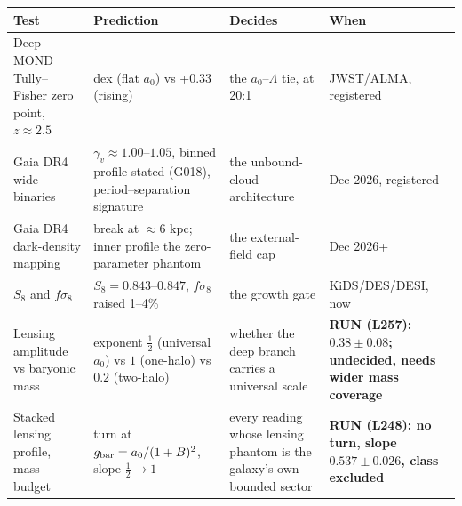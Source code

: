 \documentclass[
  11pt,
]{article}
\newcounter{none} %
\begin{document}
{\def\LTcaptype{none} %
\begin{longtable}[]{@{}
  >{\raggedright\arraybackslash}p{}
  >{\raggedright\arraybackslash}p{}
  >{\raggedright\arraybackslash}p{}
  >{\raggedright\arraybackslash}p{}@{}}
\toprule\noalign{}
\begin{minipage}[b]{\linewidth}\raggedright
Test
\end{minipage} & \begin{minipage}[b]{\linewidth}\raggedright
Prediction
\end{minipage} & \begin{minipage}[b]{\linewidth}\raggedright
Decides
\end{minipage} & \begin{minipage}[b]{\linewidth}\raggedright
When
\end{minipage} \\
\midrule\noalign{}
\endhead
\bottomrule\noalign{}
\endlastfoot
Deep-MOND Tully--Fisher zero point, \(z \approx 2.5\) & 0.00 dex (flat
\(a_0\)) vs +0.33 (rising) & the \(a_0\)--\(\Lambda\) tie, at 20:1 &
JWST/ALMA, registered \\
Gaia DR4 wide binaries & \(\gamma_v \approx 1.00\)--\(1.05\), binned
profile stated (G018), period--separation signature & the unbound-cloud
architecture & Dec 2026, registered \\
Gaia DR4 dark-density mapping & break at \(\approx 6\) kpc; inner
profile the zero-parameter phantom & the external-field cap & Dec
2026+ \\
\(S_8\) and \(f\sigma_8\) & \(S_8 = 0.843\)--\(0.847\), \(f\sigma_8\)
raised 1--4\% & the growth gate & KiDS/DES/DESI, now \\
Lensing amplitude vs baryonic mass & exponent \(\tfrac12\) (universal
\(a_0\)) vs \(1\) (one-halo) vs \(0.2\) (two-halo) & whether the deep
branch carries a universal scale & \textbf{RUN (L257):
\(0.38 \pm 0.08\); undecided, needs wider mass coverage} \\
Stacked lensing profile, mass budget & turn at
\(g_{\rm bar} = a_0/(1+B)^2\), slope \(\tfrac12 \to 1\) & every reading
whose lensing phantom is the galaxy's own bounded sector & \textbf{RUN
(L248): no turn, slope \(0.537 \pm 0.026\), class excluded} \\
\end{longtable}
}
\end{document}
